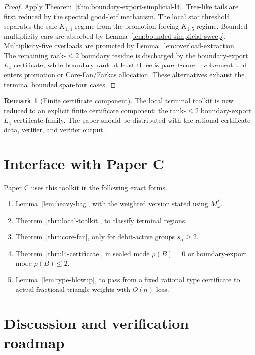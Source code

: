 \documentclass[11pt]{article}
\theoremstyle{definition}
\newtheorem{remark}[theorem]{Remark}
\begin{document}
\begin{proof}
Apply Theorem~\ref{thm:boundary-export-simplicial-l4}. Tree-like tails are first reduced by the spectral good-leaf mechanism. The local star threshold separates the safe \(K_{1,4}\) regime from the promotion-forcing \(K_{1,5}\) regime. Bounded multiplicity ears are absorbed by Lemma~\ref{lem:bounded-simplicial-sweep}. Multiplicity-five overloads are promoted by Lemma~\ref{lem:overload-extraction}. The remaining rank-\(\le2\) boundary residue is discharged by the boundary-export \(L_4\) certificate, while boundary rank at least three is parent-core involvement and enters promotion or Core-Fan/Farkas allocation. These alternatives exhaust the terminal bounded span-four cases.
\end{proof}

\begin{remark}[Finite certificate component]
The local terminal toolkit is now reduced to an explicit finite certificate component: the rank-\(\le2\) boundary-export \(L_4\) certificate family. The paper should be distributed with the rational certificate data, verifier, and verifier output.
\end{remark}


\section{Interface with Paper C}

Paper C uses this toolkit in the following exact forms.
\begin{enumerate}[label=(\roman*)]
    \item Lemma~\ref{lem:heavy-bag}, with the weighted version stated using \(M_x^*\).
    \item Theorem~\ref{thm:local-toolkit}, to classify terminal regions.
    \item Theorem~\ref{thm:core-fan}, only for debit-active groups \(s_\alpha\ge2\).
    \item Theorem~\ref{thm:l4-certificate}, in sealed mode \(\rho(B)=0\) or boundary-export mode \(\rho(B)\le2\).
    \item Lemma~\ref{lem:type-blowup}, to pass from a fixed rational type certificate to actual fractional triangle weights with \(O(n)\) loss.
\end{enumerate}

\section{Discussion and verification roadmap}
\end{document}

